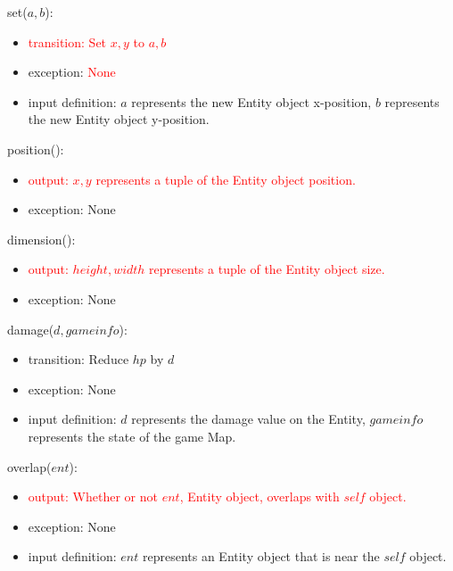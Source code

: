 \documentclass[12pt]{article}
\newcommand{\Implies}{\Rightarrow}
\newcommand{\m}[1]{\mbox{#1}}
\begin{document}
\noindent set($a, b$):
\begin{itemize}
    \item \textcolor{red}{transition: Set $x, y$ to $a, b$}
    \item exception: \textcolor{red}{None}
    \item input definition: $a$ represents the new Entity object x-position, $b$ represents the new Entity object y-position.
\end{itemize}

\noindent position():
\begin{itemize}
        \item \textcolor{red}{output: $x, y$ represents a tuple of the Entity object position.}
    \item exception: None
\end{itemize}

\noindent dimension():
\begin{itemize}
    \item \textcolor{red}{output: $height, width$ represents a tuple of the Entity object size.}
    \item exception: None
\end{itemize}

\noindent damage($d, gameinfo$):
\begin{itemize}
    \item transition: Reduce $hp$ by $d$
    \item exception: None
    \item input definition: $d$ represents the damage value on the Entity, $gameinfo$ represents the state of the game Map. 
\end{itemize}

\noindent overlap($ent$): %
\begin{itemize}
    \item \textcolor{red}{output: Whether or not $ent$, Entity object, overlaps with $self$ object. }
    \item exception: None
    \item input definition: $ent$ represents an Entity object that is near the $self$ object.
\end{itemize}
\end{document}
